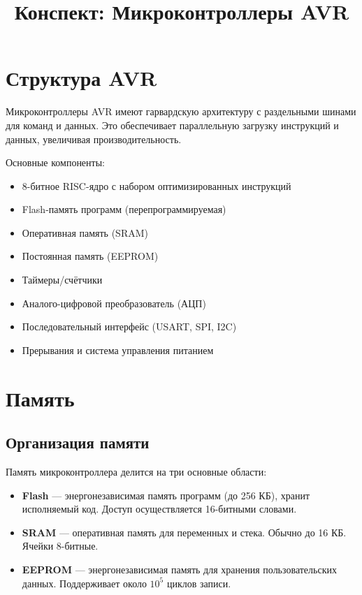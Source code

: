 \documentclass[a4paper,12pt]{article}
\title{Конспект: Микроконтроллеры AVR}
\author{}
\date{}
\begin{document}
\maketitle

\section{Структура AVR}
Микроконтроллеры AVR имеют гарвардскую архитектуру с раздельными шинами для команд и данных. Это обеспечивает параллельную загрузку инструкций и данных, увеличивая производительность.

Основные компоненты:
\begin{itemize}
    \item 8-битное RISC-ядро с набором оптимизированных инструкций
    \item Flash-память программ (перепрограммируемая)
    \item Оперативная память (SRAM)
    \item Постоянная память (EEPROM)
    \item Таймеры/счётчики
    \item Аналого-цифровой преобразователь (АЦП)
    \item Последовательный интерфейс (USART, SPI, I2C)
    \item Прерывания и система управления питанием
\end{itemize}

\section{Память}
\subsection{Организация памяти}
Память микроконтроллера делится на три основные области:
\begin{itemize}
    \item \textbf{Flash} — энергонезависимая память программ (до 256 КБ), хранит исполняемый код. Доступ осуществляется 16-битными словами.
    \item \textbf{SRAM} — оперативная память для переменных и стека. Обычно до 16 КБ. Ячейки 8-битные.
    \item \textbf{EEPROM} — энергонезависимая память для хранения пользовательских данных. Поддерживает около $10^5$ циклов записи.
\end{itemize}
\end{document}
